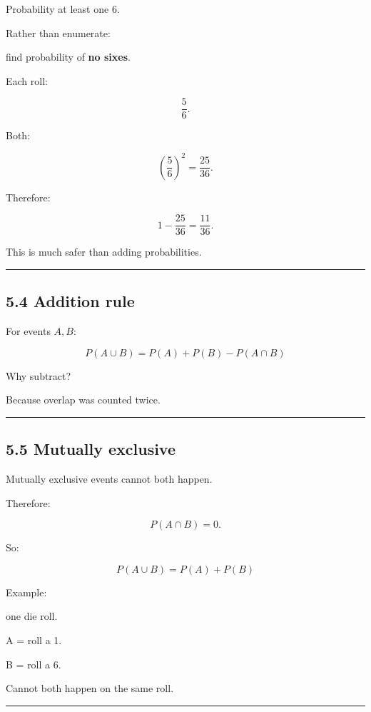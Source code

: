 \documentclass[
]{article}
\begin{document}
Probability at least one 6.

Rather than enumerate:

find probability of \textbf{no sixes}.

Each roll:

\[
\frac56.
\]

Both:

\[
\left(\frac56\right)^2
=
\frac{25}{36}.
\]

Therefore:

\[
1-\frac{25}{36}
=
\boxed{\frac{11}{36}}.
\]

This is much safer than adding probabilities.

\begin{center}\rule{0.5\linewidth}{0.5pt}\end{center}

\subsection{5.4 Addition rule}\label{addition-rule}

For events \(A,B\):

\[
\boxed{
P(A\cup B)
=
P(A)+P(B)-P(A\cap B)
}
\]

Why subtract?

Because overlap was counted twice.

\begin{center}\rule{0.5\linewidth}{0.5pt}\end{center}

\subsection{5.5 Mutually exclusive}\label{mutually-exclusive}

Mutually exclusive events cannot both happen.

Therefore:

\[
P(A\cap B)=0.
\]

So:

\[
\boxed{
P(A\cup B)
=
P(A)+P(B)
}
\]

Example:

one die roll.

A = roll a 1.

B = roll a 6.

Cannot both happen on the same roll.

\begin{center}\rule{0.5\linewidth}{0.5pt}\end{center}
\end{document}
